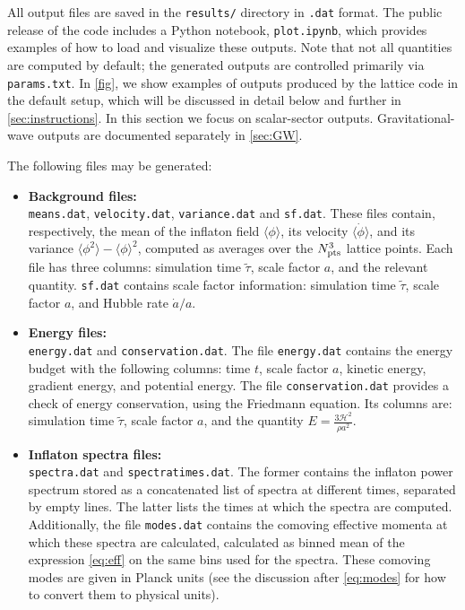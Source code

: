 \documentclass[aps, nofootinbib,superscriptaddress, preprintnumbers, longbibliography]{article}
\begin{document}
All output files are saved in the \texttt{{results/}} directory in \texttt{.dat} format. The public release of the code includes a Python notebook, \texttt{{plot.ipynb}}, which provides examples of how to load and visualize these outputs. Note that not all quantities are computed by default; the generated outputs are controlled primarily via \texttt{params.txt}. In \cref{fig}, we show examples of outputs produced by the lattice code in the default setup, which will be discussed in detail below and further in \cref{sec:instructions}. In this section we focus on scalar-sector outputs. Gravitational-wave outputs are documented separately in \cref{sec:GW}.

The following files may be generated:

\begin{itemize} 
    \item \textbf{Background files:}\\ \texttt{means.dat}, \texttt{velocity.dat}, \texttt{variance.dat} and \texttt{sf.dat}. These files contain, respectively, the mean of the inflaton field $\langle \phi \rangle$, its velocity $\langle \dot\phi \rangle$, and its variance $\langle \phi^2 \rangle - \langle \phi \rangle^2$, computed as averages over the $N^3_{\rm pts}$ lattice points. Each file has three columns: simulation time $\tilde{\tau}$, scale factor $a$, and the relevant quantity. \texttt{sf.dat} contains scale factor information: simulation time $\tilde{\tau}$, scale factor $a$, and Hubble rate $\dot{a}/a$.

    \item \textbf{Energy files:} \\ \texttt{energy.dat} and \texttt{conservation.dat}. The file \texttt{energy.dat} contains the energy budget with the following columns: time $t$, scale factor $a$, kinetic energy, gradient energy, and potential energy. The file \texttt{conservation.dat} provides a check of energy conservation, using the Friedmann equation. Its columns are: simulation time $\tilde{\tau}$, scale factor $a$, and the quantity $E = \frac{3\mathcal{H}^2}{\rho a^2}$.

    \item \textbf{Inflaton spectra files:} \\ \texttt{spectra.dat} and \texttt{spectratimes.dat}. The former contains the inflaton power spectrum stored as a concatenated list of spectra at different times, separated by empty lines. The latter lists the times at which the spectra are computed. Additionally, the file \texttt{modes.dat} contains the comoving effective momenta at which these spectra are calculated, calculated as binned mean of the expression \cref{eq:eff} on the same bins used for the spectra. These comoving modes are given in Planck units (see the discussion after \cref{eq:modes} for how to convert them to physical units).


\end{itemize}
\end{document}

